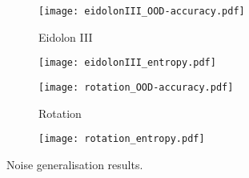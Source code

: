\begin{figure}
	\begin{subfigure}{\figwidth}
		\centering
		\texttt{[image: eidolonIII\_OOD-accuracy.pdf]}
		\vspace{\captionspace}
		\caption{Eidolon III}
	\end{subfigure}\hfill
	\begin{subfigure}{\figwidth}
		\centering        \texttt{[image: eidolonIII\_entropy.pdf]}
		\vspace{\captionspace}
		\caption*{}
	\end{subfigure}\hfill
	\begin{subfigure}{\figwidth}
		\centering
		\texttt{[image: rotation\_OOD-accuracy.pdf]}
		\vspace{\captionspace}
		\caption{Rotation}
	\end{subfigure}\hfill
	\begin{subfigure}{\figwidth}
		\centering
		\texttt{[image: rotation\_entropy.pdf]}
		\vspace{\captionspace}
		\caption*{}
	\end{subfigure}\hfill
	\caption{Noise generalisation results.}
	\label{fig:results_accuracy_entropy}
\end{figure}